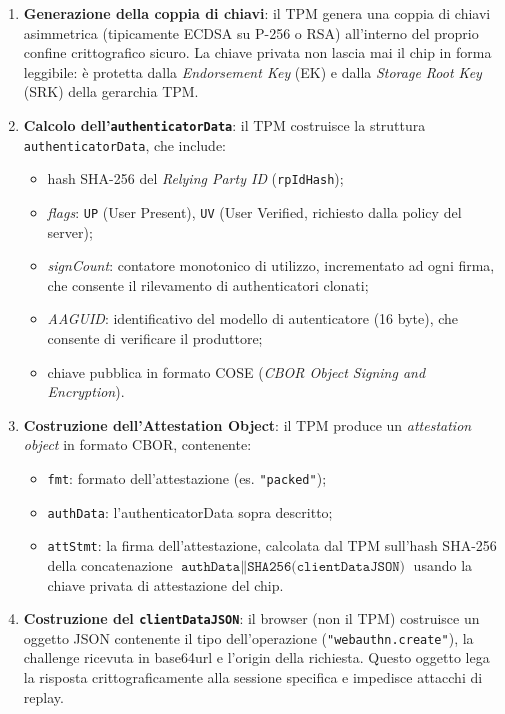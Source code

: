 \begin{enumerate}
  \item \textbf{Generazione della coppia di chiavi}: il TPM genera una
    coppia di chiavi asimmetrica (tipicamente ECDSA su P-256 o RSA)
    all'interno del proprio confine crittografico sicuro. La chiave
    privata non lascia mai il chip in forma leggibile: è protetta dalla
    \emph{Endorsement Key} (EK) e dalla \emph{Storage Root Key} (SRK)
    della gerarchia TPM.

  \item \textbf{Calcolo dell'\texttt{authenticatorData}}: il TPM costruisce
    la struttura \texttt{authenticatorData}, che include:
    \begin{itemize}
      \item hash SHA-256 del \emph{Relying Party ID} (\texttt{rpIdHash});
      \item \emph{flags}: \texttt{UP} (User Present), \texttt{UV}
        (User Verified, richiesto dalla policy del server);
      \item \emph{signCount}: contatore monotonico di utilizzo,
        incrementato ad ogni firma, che consente il rilevamento di
        authenticatori clonati;
      \item \emph{AAGUID}: identificativo del modello di autenticatore
        (16 byte), che consente di verificare il produttore;
      \item chiave pubblica in formato COSE (\emph{CBOR Object Signing
        and Encryption}).
    \end{itemize}

  \item \textbf{Costruzione dell'Attestation Object}: il TPM produce un
    \emph{attestation object} in formato CBOR, contenente:
    \begin{itemize}
      \item \texttt{fmt}: formato dell'attestazione (es. \texttt{"packed"});
      \item \texttt{authData}: l'authenticatorData sopra descritto;
      \item \texttt{attStmt}: la firma dell'attestazione, calcolata dal
        TPM sull'hash SHA-256 della concatenazione
        $\texttt{authData} \| \texttt{SHA256(clientDataJSON)}$
        usando la chiave privata di attestazione del chip.
    \end{itemize}

  \item \textbf{Costruzione del \texttt{clientDataJSON}}: il browser
    (non il TPM) costruisce un oggetto JSON contenente il tipo
    dell'operazione (\texttt{"webauthn.create"}), la challenge
    ricevuta in base64url e l'origin della richiesta. Questo oggetto
    lega la risposta crittograficamente alla sessione specifica e
    impedisce attacchi di replay.
\end{enumerate}

